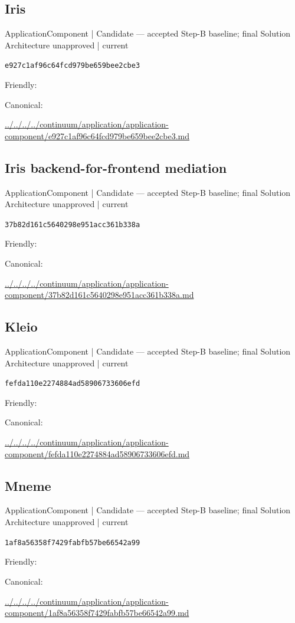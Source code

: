 \documentclass[10pt,a4paper]{article}
\begin{document}
\subsection*{Iris}
{\small ApplicationComponent | Candidate — accepted Step-B baseline; final Solution Architecture unapproved | current}\par
\texttt{e927c1af96c64fcd979be659bee2cbe3}\par
Friendly: \par
Canonical: \par
{\footnotesize\url{../../../../continuum/application/application-component/e927c1af96c64fcd979be659bee2cbe3.md}}\par
\subsection*{Iris backend-for-frontend mediation}
{\small ApplicationComponent | Candidate — accepted Step-B baseline; final Solution Architecture unapproved | current}\par
\texttt{37b82d161c5640298e951acc361b338a}\par
Friendly: \par
Canonical: \par
{\footnotesize\url{../../../../continuum/application/application-component/37b82d161c5640298e951acc361b338a.md}}\par
\subsection*{Kleio}
{\small ApplicationComponent | Candidate — accepted Step-B baseline; final Solution Architecture unapproved | current}\par
\texttt{fefda110e2274884ad58906733606efd}\par
Friendly: \par
Canonical: \par
{\footnotesize\url{../../../../continuum/application/application-component/fefda110e2274884ad58906733606efd.md}}\par
\subsection*{Mneme}
{\small ApplicationComponent | Candidate — accepted Step-B baseline; final Solution Architecture unapproved | current}\par
\texttt{1af8a56358f7429fabfb57be66542a99}\par
Friendly: \par
Canonical: \par
{\footnotesize\url{../../../../continuum/application/application-component/1af8a56358f7429fabfb57be66542a99.md}}\par
\end{document}

